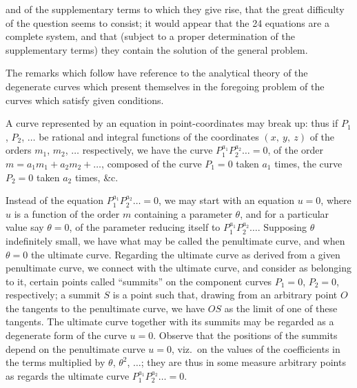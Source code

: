 \documentclass[12pt,a4paper,oneside]{book}
\begin{document}
\newpage
and of the supplementary terms to which they give rise, that the great difficulty of the question seems to consist; it would appear that the 24 equations are a complete system, and that (subject to a proper determination of the supplementary terms) they contain the solution of the general problem.

The remarks which follow have reference to the analytical theory of the degenerate curves which present themselves in the foregoing problem of the curves which satisfy given conditions.

A curve represented by an equation in point-coordinates may break up: thus if $P_{1}$, $P_{2}$, $\dots$ be rational and integral functions of the coordinates $(x,\ y,\ z)$ of the orders $m_{1}$, $m_{2}$, $\dots$ respectively, we have the curve $P_{1}^{a_{1}}P_{2}^{a_{2}}\dots =0$, of the order $m=a_{1}m_{1}+a_{2}m_{2}+\dots$, composed of the curve $P_{1}=0$ taken $a_{1}$ times, the curve $P_{2}=0$ taken $a_{2}$ times, \&c.

Instead of the equation $P_{1}^{a_{1}}P_{2}^{a_{2}}\dots =0$, we may start with an equation $u=0$, where $u$ is a function of the order $m$ containing a parameter $\theta$, and for a particular value say $\theta=0$, of the parameter reducing itself to $P_{1}^{a_{1}}P_{2}^{a_{2}}\dots$. Supposing $\theta$ indefinitely small, we have what may be called the penultimate curve, and when $\theta=0$ the ultimate curve. Regarding the ultimate curve as derived from a given penultimate curve, we connect with the ultimate curve, and consider as belonging to it, certain points called ``summits'' on the component curves $P_{1}=0$, $P_{2}=0$, respectively; a summit $S$ is a point such that, drawing from an arbitrary point $O$ the tangents to the penultimate curve, we have $OS$ as the limit of one of these tangents. The ultimate curve together with its summits may be regarded as a degenerate form of the curve $u=0$. Observe that the positions of the summits depend on the penultimate curve $u=0$, viz.\ on the values of the coefficients in the terms multiplied by $\theta$, $\theta^{2}$, $\dots$; they are thus in some measure arbitrary points as regards the ultimate curve $P_{1}^{a_{1}}P_{2}^{a_{2}}\dots =0$.
\end{document}
